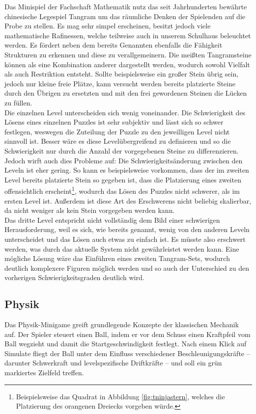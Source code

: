 Das Minispiel der Fachschaft Mathematik nutz das seit Jahrhunderten bewährte chinesische Legespiel \glqq Tangram\grqq{} um das räumliche Denken der Spielenden auf die Probe zu stellen.
Es mag sehr simpel erscheinen, besitzt jedoch viele mathematische Rafinessen, welche teilweise auch in unserem Schulhaus beleuchtet werden. 
Es fördert neben dem bereits Genannten ebenfalls die Fähigkeit Strukturen zu erkennen und diese zu verallgemeinern.
Die meißten Tangramsteine können als eine Kombination anderer dargestellt werden, wodurch sowohl Vielfalt als auch Restriktion entsteht.
Sollte beispielsweise ein großer Stein übrig sein, jedoch nur kleine freie Plätze, kann versucht werden bereits platzierte Steine durch den Übrigen zu ersetzten und mit den frei gewordenen Steinen die Lücken zu füllen.\\
Die einzelnen Level unterscheiden sich wenig voneinander.
Die Schwierigkeit des Lösens eines einzelnen Puzzles ist sehr subjektiv und lässt sich so schwer festlegen, weswegen die Zuteilung der Puzzle zu den jeweilligen Level nicht sinnvoll ist.
Besser wäre es diese Levelübergreifend zu definieren und so die Schwierigkeit nur durch die Anzahl der vorgegebenen Steine zu differenzieren.
Jedoch wirft auch dies Probleme auf:
Die Schwierigkeitsänderung zwischen den Leveln ist eher gering.
So kann es beispielsweise vorkommen, dass der im zweiten Level bereits platzierte Stein so gegeben ist, dass die Platzierung eines zweiten offensichtlich erscheint\footnote{Beispielsweise das Quadrat in Abbildung \ref{fig:tninjastern}, welches die Platzierung des orangenen Dreiecks vorgeben würde.}, wodurch das Lösen des Puzzles nicht schwerer, als im ersten Level ist.
Außerdem ist diese Art des Erschwerens nicht beliebig skalierbar, da nicht weniger als kein Stein vorgegeben werden kann.\\
Das dritte Level entspricht nicht vollständig dem Bild einer schwierigen Herausforderung, weil es sich, wie bereits genannt, wenig von den anderen Leveln unterscheidet und das Lösen auch etwas zu einfach ist.
Es müsste also erschwert werden, was durch das aktuelle System nicht gewährleistet werden kann.
Eine mögliche Lösung wäre das Einführen eines zweiten Tangram-Sets, wodurch deutlich komplexere Figuren möglich werden und so auch der Unterschied zu den vorherigen Schwierigkeitsgraden deutlich wird.

\subsection{Physik}
Das Physik-Minigame greift grundlegende Konzepte der klassischen Mechanik auf. Der Spieler steuert einen Ball, indem er vor dem Schuss einen Kraftpfeil vom Ball wegzieht und damit die Startgeschwindigkeit festlegt. Nach einem Klick auf \glqq{}Simulate\grqq{} fliegt der Ball unter dem Einfluss verschiedener Beschleunigungskräfte – darunter Schwerkraft und levelspezifische Driftkräfte – und soll ein grün markiertes Zielfeld treffen.

